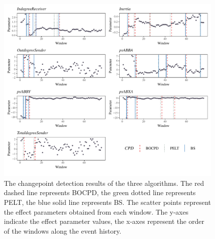 \documentclass[]{interact}
\theoremstyle{plain}%
\theoremstyle{definition}
\theoremstyle{remark}
\begin{document}
{	\begin{figure}[H]
		\captionsetup{justification=raggedright}
		\renewcommand{\figurename}{Figure}
		\centering
		\includegraphics[width=\textwidth,height=\textheight,keepaspectratio]{Apollo_CPD_bw}
		\caption{\fontsize{8}{10}\selectfont The changepoint detection results of the three algorithms. The red dashed line represents BOCPD, the green dotted line represents PELT, the blue solid line represents BS. The scatter points represent the effect parameters obtained from each window. The y-axes indicate the effect parameter values, the x-axes represent the order of the windows along the event history.}
		\label{Apollo_effects_cp_plot}
	\end{figure}

}
\end{document}
